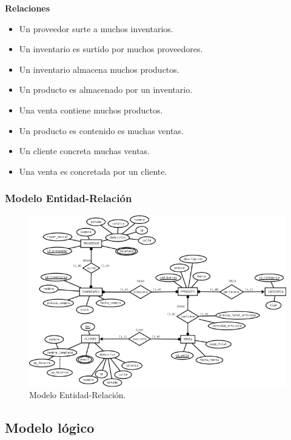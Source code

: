 \documentclass[12pt,letterpaper]{article}
\begin{document}
	\textbf{Relaciones}\par
	\begin{itemize}
		\item Un proveedor surte a muchos inventarios.
		\item Un inventario es surtido por muchos proveedores.\\
		\item Un inventario almacena muchos productos.
		\item Un producto es almacenado por un inventario.\\
		\item Una venta contiene muchos productos.
		\item Un producto es contenido es muchas ventas.\\
		\item Un cliente concreta muchas ventas.
		\item Una venta es concretada por un cliente.
		
	\end{itemize}
	\subsubsection{Modelo Entidad-Relación}
	\begin{figure}[H]
		\centering
		\includegraphics[width=\linewidth]{img/MER.png}
		\caption{Modelo Entidad-Relación.}
	\end{figure}
	
	
	\subsection{Modelo lógico}
\end{document}
